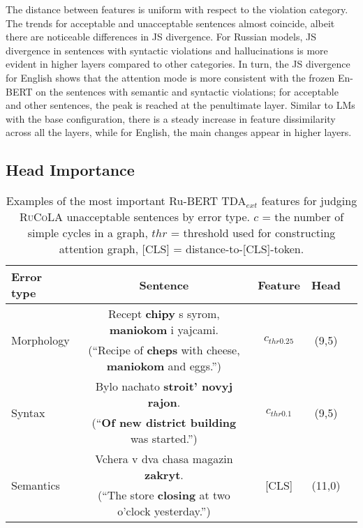 \documentclass[11pt]{article}
\begin{document}
The distance between features is uniform with respect to the violation category.
The trends for acceptable and unacceptable sentences almost coincide, albeit there are noticeable differences in JS divergence. 
For Russian models, JS divergence in sentences with syntactic violations and hallucinations is more evident in higher layers compared to other categories. 
In turn, the JS divergence for English shows that the attention mode is more consistent with the frozen En-BERT on the sentences with semantic and syntactic violations; for acceptable and other sentences, the peak is reached at the penultimate layer. 
Similar to LMs with the base configuration, there is a steady increase in feature dissimilarity across all the layers, while for English, the main changes appear in higher layers.

\subsection{Head Importance}
\begin{table*}[ht]
\centering
\begin{center}
\begin{tabular}{lcccc}
\toprule
\textbf{Error type} & \textbf{Sentence} & \textbf{Feature} & \textbf{Head}\\
\midrule
    \multirow{2}{*}{Morphology}
    & Recept \textbf{chipy} s syrom, \textbf{maniokom} i yajcami.
    &\multirow{2}{*}{$c_{thr0.25}$} 
    & \multirow{2}{*}{(9,5)} \\
    &  (``Recipe of \textbf{cheps} with cheese, \textbf{maniokom} and eggs.'') & &\\
    \midrule
    \multirow{2}{*}{Syntax}
    & Bylo nachato \textbf{stroit' novyj rajon}.
    & \multirow{2}{*}{$c_{thr0.1}$}
    & \multirow{2}{*}{(9,5)}\\
    &  (``\textbf{Of new district building} was started.'')
    & &\\
    \midrule
    \multirow{2}{*}{Semantics}
    & Vchera v dva chasa magazin \textbf{zakryt}. 
    & \multirow{2}{*}{\textsc{[CLS]}}
    & \multirow{2}{*}{(11,0)}\\
    & (``The store \textbf{closing} at two o'clock yesterday.'')
    & &\\
\bottomrule
\end{tabular}
\end{center}
\caption{\label{tab:feature_imp_error} Examples of the most important Ru-BERT TDA$_{ext}$ features for judging \textsc{RuCoLA} unacceptable sentences by error type. $c$ = the number of simple cycles in a graph, $thr$ = threshold used for constructing attention graph, \textsc{[CLS]} = distance-to-\textsc{[CLS]}-token.}
\end{table*}
\end{document}
